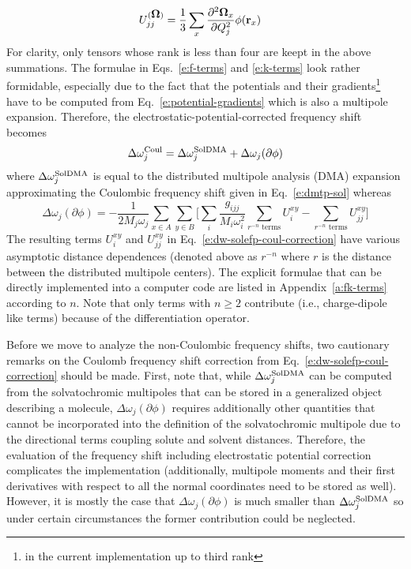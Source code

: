 \documentclass[a4paper,titlepage,twoside,fleqn,12pt]{book}
\newcommand{\BM}[1]{\ensuremath{\mbox{\boldmath${#1}$}}}
\newcommand{\sderiv}[2]{\ensuremath{
\frac{\partial^2 #1}{\partial #2^2}
}}
\begin{document}
\begin{refsection}
\begin{subequations}
\begin{align}
    \label{e:k-terms-3} \\
%
 U_{jj}^{(\BM\Omega)}  &= \frac{1}{3} \sum_x \sderiv{{\BM \Omega}_x}{Q_j} \phi({\bf r}_x)       \label{e:k-terms-4}
\end{align}
\end{subequations}
%
For clarity, only tensors whose rank is less than four are keept in the above summations.
The formulae in Eqs.~\eqref{e:f-terms} and \eqref{e:k-terms} look rather formidable,
especially due to the fact that the potentials and their 
gradients\footnote{in the current implementation up to third rank}
have to be computed from Eq.~\eqref{e:potential-gradients}
which is also a multipole expansion. Therefore,
the electrostatic\hyp{}potential\hyp{}corrected frequency shift
becomes
%
\begin{equation} \label{e:dw-solefp-coul}
\Delta \omega_j^{\rm Coul} = \Delta \omega_j^{\rm SolDMA} + \Delta\omega_j({\partial\phi}) 
\end{equation}
%
where $\Delta \omega_j^{\rm SolDMA}$ is equal to the distributed multipole analysis (DMA)
expansion approximating the Coulombic frequency shift given in Eq.~\eqref{e:dmtp-sol} whereas
%
\begin{equation} \label{e:dw-solefp-coul-correction}
\Delta\omega_j({\partial\phi})  = -\frac{1}{2M_j\omega_j}
\sum_{x \in A}\sum_{y \in B}
\Big[
\sum_i  \frac{g_{ijj}}{M_i\omega_i^2} \sum_{r^{-n} \textrm{ terms} } U_i^{xy} - \sum_{r^{-n} \textrm{ terms} } U_{jj}^{xy}
\Big]
\end{equation}
%
The resulting terms $U_i^{xy}$ and $U_{jj}^{xy}$ in Eq.~\eqref{e:dw-solefp-coul-correction}
have various asymptotic distance dependences (denoted above as $r^{-n}$
where $r$ is the distance between the distributed multipole centers).
The explicit formulae
that can be directly implemented into a computer code
are listed in Appendix~\ref{a:fk-terms} according to $n$. 
Note that only terms with $n\ge 2$ contribute (i.e., charge-dipole
like terms) because of the differentiation operator.

Before we move to analyze the non\hyp{}Coulombic frequency shifts, two cautionary remarks
on the Coulomb frequency shift correction from Eq.~\eqref{e:dw-solefp-coul-correction} should be made.
First, note that, while $\Delta \omega_j^{\rm SolDMA}$ can be computed from the
solvatochromic multipoles that can be stored in a generalized object
describing a molecule, $\Delta\omega_j({\partial\phi})$ requires 
additionally other quantities that cannot be incorporated
into the definition of the solvatochromic multipole due to the directional
terms coupling solute and solvent distances. Therefore,
the evaluation of the frequency shift including electrostatic potential
correction complicates the implementation (additionally, multipole moments
and their first derivatives with respect to all the normal coordinates need 
to be stored as well). However, it is mostly the case
that $\Delta\omega_j({\partial\phi})$ is much smaller than $\Delta \omega_j^{\rm SolDMA}$
so under certain circumstances the former contribution could be
neglected.


\end{refsection}
\end{document}
